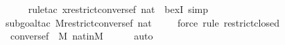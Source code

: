\begin{isabellebody}
\ \ \ \ \isamarkupfalse%
{\isacharparenleft}{\kern0pt}rule{\isacharunderscore}{\kern0pt}tac\ x{\isacharequal}{\kern0pt}{\isachardoublequoteopen}restrict{\isacharparenleft}{\kern0pt}converse{\isacharparenleft}{\kern0pt}f{\isacharparenright}{\kern0pt}{\isacharcomma}{\kern0pt}\ nat{\isacharparenright}{\kern0pt}{\isachardoublequoteclose}\ \ bexI{\isacharcomma}{\kern0pt}\ simp{\isacharparenright}{\kern0pt}\isanewline
\ \ \ \ \isamarkupfalse%
{\isacharparenleft}{\kern0pt}subgoal{\isacharunderscore}{\kern0pt}tac\ {\isachardoublequoteopen}{\isacharparenleft}{\kern0pt}{\isacharhash}{\kern0pt}{\isacharhash}{\kern0pt}M{\isacharparenright}{\kern0pt}{\isacharparenleft}{\kern0pt}restrict{\isacharparenleft}{\kern0pt}converse{\isacharparenleft}{\kern0pt}f{\isacharparenright}{\kern0pt}{\isacharcomma}{\kern0pt}\ nat{\isacharparenright}{\kern0pt}{\isacharparenright}{\kern0pt}{\isachardoublequoteclose}{\isacharparenright}{\kern0pt}\isanewline
\ \ \ \ \isamarkupfalse%
{\isacharparenleft}{\kern0pt}force{\isacharcomma}{\kern0pt}\ rule\ restrict{\isacharunderscore}{\kern0pt}closed{\isacharparenright}{\kern0pt}\isanewline
\ \ \ \ \isamarkupfalse%
\ {\isacartoucheopen}converse{\isacharparenleft}{\kern0pt}f{\isacharparenright}{\kern0pt}\ {\isasymin}\ M{\isacartoucheclose}\ nat{\isacharunderscore}{\kern0pt}in{\isacharunderscore}{\kern0pt}M\isanewline
\ \ \ \ \isamarkupfalse%
\ auto\isanewline
{}\isamarkupfalse%
%
\endisatagproof
{\isafoldproof}%
%
\isadelimproof
\isanewline
%
\endisadelimproof
\ \ \ \ \ \ \isanewline
{}\isamarkupfalse%
\ \isanewline
%
\isadelimtheory
%
\endisadelimtheory
%
\isatagtheory
{}\isamarkupfalse%
%
\endisatagtheory
{\isafoldtheory}%
%
\isadelimtheory
%
\endisadelimtheory
%
\end{isabellebody}%
\endinput
